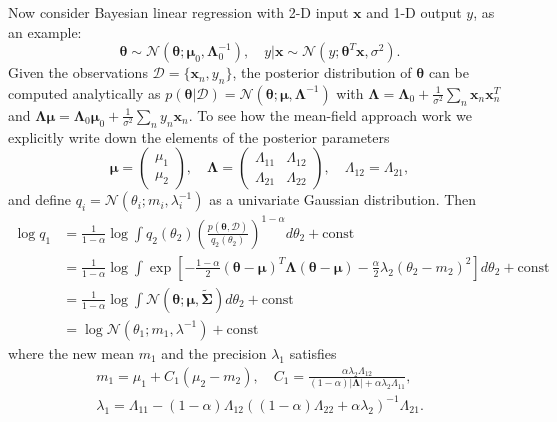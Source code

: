 Now consider Bayesian linear regression with 2-D input $\bm{x}$ and 1-D output $y$, as an example:
\begin{equation*}
\bm{\theta} \sim \mathcal{N}(\bm{\theta}; \bm{\mu}_0, \bm{\Lambda}_0^{-1}), \quad 
y|\bm{x} \sim \mathcal{N}(y; \bm{\theta}^T \bm{x}, \sigma^2).
\end{equation*}
Given the observations $\mathcal{D} = \{\bm{x}_n, y_n \}$, the posterior distribution of $\bm{\theta}$ can be computed analytically as $p(\bm{\theta}|\mathcal{D}) = \mathcal{N}(\bm{\theta}; \bm{\mu}, \bm{\Lambda}^{-1})$ with $\bm{\Lambda} = \bm{\Lambda}_0 + \frac{1}{\sigma^2} \sum_n \bm{x}_n \bm{x}_n^T$ and $\bm{\Lambda} \bm{\mu} = \bm{\Lambda}_0 \bm{\mu}_0 + \frac{1}{\sigma^2} \sum_n y_n \bm{x}_n$. To see how the mean-field approach work we explicitly write down the elements of the posterior parameters
\begin{equation*}
\bm{\mu} = \begin{pmatrix} \mu_1 \\ \mu_2 \end{pmatrix}, \quad
\bm{\Lambda} = \begin{pmatrix} \Lambda_{11} & \Lambda_{12} \\ \Lambda_{21} & \Lambda_{22} \end{pmatrix}, 
\quad \Lambda_{12} = \Lambda_{21},
\end{equation*}
and define $q_i = \mathcal{N}(\theta_i; m_i, \lambda_i^{-1})$ as a univariate Gaussian distribution. Then
\begin{equation*}
\begin{aligned}
\log q_1 &= \frac{1}{1 - \alpha} \log \int q_2(\theta_2)  \left( \frac{p(\bm{\theta}, \mathcal{D})}{q_2(\theta_2)} \right)^{1 - \alpha} d\theta_2 + \text{const} \\
&= \frac{1}{1 - \alpha} \log \int \exp \left[ -\frac{1 - \alpha}{2} (\bm{\theta} - \bm{\mu})^T \bm{\Lambda} (\bm{\theta} - \bm{\mu}) - \frac{\alpha}{2} \lambda_2 (\theta_2 - m_2)^2 \right] d\theta_2 + \text{const} \\
&= \frac{1}{1 - \alpha} \log \int \mathcal{N}(\bm{\theta}; \bm{\mu}, \tilde{\bm{\Sigma}}) d\theta_2 + \text{const} \\
&= \log \mathcal{N}(\theta_1; m_1, \lambda^{-1}) + \text{const}
\end{aligned}
\end{equation*}
where the new mean $m_1$ and the precision $\lambda_1$ satisfies
\begin{equation*}
\begin{aligned}
m_1 = \mu_1 + C_1(\mu_2 - m_2), \quad C_1 = \frac{\alpha \lambda_2 \Lambda_{12}}{(1 - \alpha) |\bm{\Lambda}| + \alpha \lambda_2 \Lambda_{11}}, \\
\lambda_1 = \Lambda_{11} - (1 - \alpha) \Lambda_{12} ((1 - \alpha) \Lambda_{22} + \alpha \lambda_2)^{-1} \Lambda_{21}.
\end{aligned}
\end{equation*}
